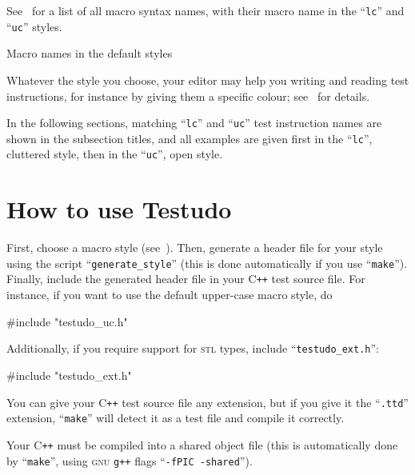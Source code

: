 \documentclass[twoside, a4paper, article]{memoir}
\newcommand*\Cpp{C\texttt{++}}
\begin{document}
See~ for a list of all macro syntax names, with their
macro name in the ``\texttt{lc}'' and ``\texttt{uc}'' styles.

\begin{table}
  \centering
  \begin{footnotesize}
    
  \end{footnotesize}
  \caption{Macro names in the default styles}
  \label{tab:style-table}
\end{table}

Whatever the style you choose, your editor may help you writing and reading
test instructions, for instance by giving them a specific colour;
see~ for details.

In the following sections, matching ``\texttt{lc}'' and ``\texttt{uc}'' test
instruction names are shown in the subsection titles, and all examples are
given first in the ``\texttt{lc}'', cluttered style, then in the
``\texttt{uc}'', open style.


\chapter{How to use Testudo}
\label{cha:how-to-use}

First, choose a macro style
(see~).  Then, generate a
header file for your style using the script ``\texttt{generate\_style}'' (this
is done automatically if you use ``\texttt{make}'').  Finally, include the
generated header file in your \Cpp{} test source file.  For instance, if you
want to use the default upper-case macro style, do
\begin{cpplisting}
#include "testudo_uc.h"
\end{cpplisting}

Additionally, if you require support for \textsc{stl} types, include
``\texttt{testudo\_ext.h}'':
\begin{cpplisting}
#include "testudo_ext.h"
\end{cpplisting}

You can give your \Cpp{} test source file any extension, but if you give it the
``\texttt{.ttd}'' extension, ``\texttt{make}'' will detect it as a test file
and compile it correctly.

Your \Cpp{} must be compiled into a shared object file (this is automatically
done by ``\texttt{make}'', using \textsc{gnu} \texttt{g++} flags
``\texttt{-fPIC -shared}'').
\end{document}
